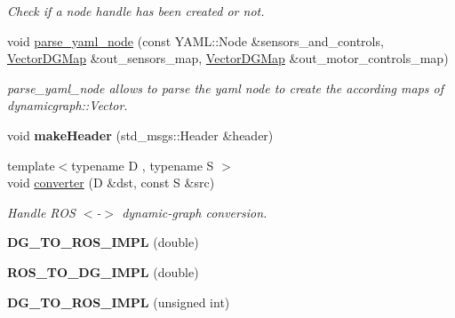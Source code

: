 \begin{DoxyCompactItemize}
\begin{DoxyCompactList}\small\item\em Check if a node handle has been created or not. \end{DoxyCompactList}\item 
void \hyperlink{namespacedynamic__graph_a3473e2d5502f8a2bff6b43cbc2d35e07}{parse\+\_\+yaml\+\_\+node} (const Y\+A\+M\+L\+::\+Node \&sensors\+\_\+and\+\_\+controls, \hyperlink{namespacedynamic__graph_a51212ed7fa4ae81e7b362a27f09b7ab8}{Vector\+D\+G\+Map} \&out\+\_\+sensors\+\_\+map, \hyperlink{namespacedynamic__graph_a51212ed7fa4ae81e7b362a27f09b7ab8}{Vector\+D\+G\+Map} \&out\+\_\+motor\+\_\+controls\+\_\+map)
\begin{DoxyCompactList}\small\item\em parse\+\_\+yaml\+\_\+node allows to parse the yaml node to create the according maps of dynamicgraph\+::\+Vector. \end{DoxyCompactList}\item 
void {\bfseries make\+Header} (std\+\_\+msgs\+::\+Header \&header)\hypertarget{namespacedynamic__graph_a7932709c47f2977a4478bd6f035ee12b}{}\label{namespacedynamic__graph_a7932709c47f2977a4478bd6f035ee12b}

\item 
{\footnotesize template$<$typename D , typename S $>$ }\\void \hyperlink{namespacedynamic__graph_aa00932c9efb8a607efd6997386d78680}{converter} (D \&dst, const S \&src)
\begin{DoxyCompactList}\small\item\em Handle R\+OS $<$-\/$>$ dynamic-\/graph conversion. \end{DoxyCompactList}\item 
{\bfseries D\+G\+\_\+\+T\+O\+\_\+\+R\+O\+S\+\_\+\+I\+M\+PL} (double)\hypertarget{namespacedynamic__graph_a22ff0d85472d1b606719f789a73224c3}{}\label{namespacedynamic__graph_a22ff0d85472d1b606719f789a73224c3}

\item 
{\bfseries R\+O\+S\+\_\+\+T\+O\+\_\+\+D\+G\+\_\+\+I\+M\+PL} (double)\hypertarget{namespacedynamic__graph_a8487bee8650edee2dabb3c21662f411f}{}\label{namespacedynamic__graph_a8487bee8650edee2dabb3c21662f411f}

\item 
{\bfseries D\+G\+\_\+\+T\+O\+\_\+\+R\+O\+S\+\_\+\+I\+M\+PL} (unsigned int)\hypertarget{namespacedynamic__graph_a894a6396a849e5a251f807e42f160c28}{}\label{namespacedynamic__graph_a894a6396a849e5a251f807e42f160c28}


\end{DoxyCompactItemize}
